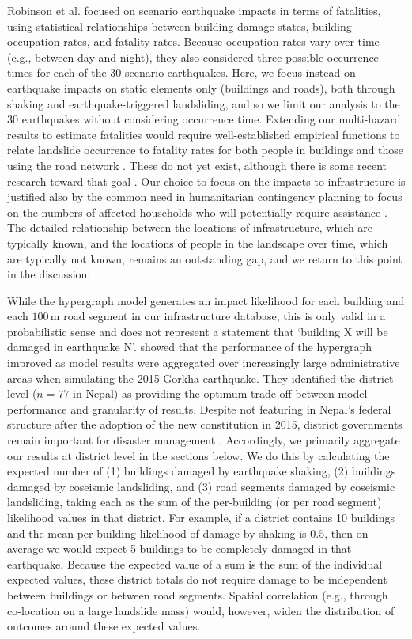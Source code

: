 \documentclass[preprint,12pt,authoryear]{elsarticle}
\begin{document}
Robinson et al. \citep{Robinson2018} focused on scenario earthquake impacts in terms of fatalities, using statistical relationships between building damage states, building occupation rates, and fatality rates. Because occupation rates vary over time (e.g., between day and night), they also considered three possible occurrence times for each of the 30 scenario earthquakes. Here, we focus instead on earthquake impacts on static elements only (buildings and roads), both through shaking and earthquake-triggered landsliding, and so we limit our analysis to the 30 earthquakes without considering occurrence time. Extending our multi-hazard results to estimate fatalities would require well-established empirical functions to relate landslide occurrence to fatality rates for both people in buildings and those using the road network \citep{VanWykDeVries2024}. These do not yet exist, although there is some recent research toward that goal \citep{Pollock2020,Luo2023,Hu2024}. Our choice to focus on the impacts to infrastructure is justified also by the common need in humanitarian contingency planning to focus on the numbers of affected households who will potentially require assistance \citep{IASC2007}. The detailed relationship between the locations of infrastructure, which are typically known, and the locations of people in the landscape over time, which are typically not known, remains an outstanding gap, and we return to this point in the discussion.

While the hypergraph model generates an impact likelihood for each building and each $100\,\text{m}$ road segment in our infrastructure database, this is only valid in a probabilistic sense and does not represent a statement that `building X will be damaged in earthquake N'. \cite{Dunant2025} showed that the performance of the hypergraph improved as model results were aggregated over increasingly large administrative areas when simulating the 2015 Gorkha earthquake. They identified the district level ($n = 77$ in Nepal) as providing the optimum trade-off between model performance and granularity of results. Despite not featuring in Nepal's federal structure after the adoption of the new constitution in 2015, district governments remain important for disaster management \citep{Bhandari2020}. Accordingly, we primarily aggregate our results at district level in the sections below. We do this by calculating the expected number of (1) buildings damaged by earthquake shaking, (2) buildings damaged by coseismic landsliding, and (3) road segments damaged by coseismic landsliding, taking each as the sum of the per-building (or per road segment) likelihood values in that district. For example, if a district contains 10 buildings and the mean per-building likelihood of damage by shaking is $0.5$, then on average we would expect 5 buildings to be completely damaged in that earthquake. Because the expected value of a sum is the sum of the individual expected values, these district totals do not require damage to be independent between buildings or between road segments. Spatial correlation (e.g., through co-location on a large landslide mass) would, however, widen the distribution of outcomes around these expected values.
\end{document}
